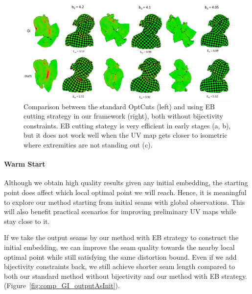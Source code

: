 \begin{figure}[!h]
\centering
\includegraphics[width=0.8\linewidth]{fig/comp_GI.png}
\caption{Comparison between the standard OptCuts (left) and using EB cutting strategy in our framework (right), both without bijectivity constraints. EB cutting stategy is very efficient in early stages (a, b), but it does not work well when the UV map gets closer to isometric where extremities are not standing out (c).}
\label{fig:comp_GI}
\end{figure}

\paragraph{Warm Start}
Although we obtain high quality results given any initial embedding, the starting point does affect which local optimal point we will reach. Hence, it is meaningful to explore our method starting from initial seams with global observations. This will also benefit practical scenarios for improving preliminary UV maps while stay close to it.

If we take the output seams by our method with EB strategy to construct the initial embedding, we can improve the seam quality towards the nearby local optimal point while still satisfying the same distortion bound. Even if we add bijectivity constraints back, we still achieve shorter seam length compared to both our standard method without bijectivity and our method with EB strategy. (Figure~\ref{fig:comp_GI_outputAsInit}).

